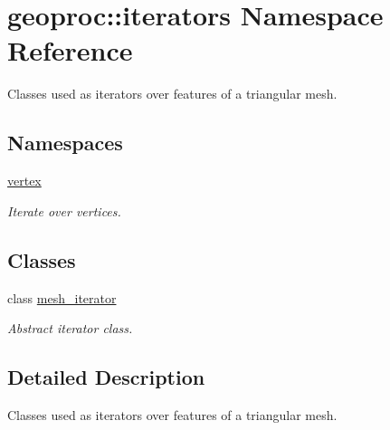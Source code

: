\hypertarget{namespacegeoproc_1_1iterators}{}\section{geoproc\+:\+:iterators Namespace Reference}
\label{namespacegeoproc_1_1iterators}


Classes used as iterators over features of a triangular mesh.  


\subsection*{Namespaces}
\begin{DoxyCompactItemize}
\item 
 \hyperlink{namespacegeoproc_1_1iterators_1_1vertex}{vertex}
\begin{DoxyCompactList}\small\item\em Iterate over vertices. \end{DoxyCompactList}\end{DoxyCompactItemize}
\subsection*{Classes}
\begin{DoxyCompactItemize}
\item 
class \hyperlink{classgeoproc_1_1iterators_1_1mesh__iterator}{mesh\+\_\+iterator}
\begin{DoxyCompactList}\small\item\em Abstract iterator class. \end{DoxyCompactList}\end{DoxyCompactItemize}


\subsection{Detailed Description}
Classes used as iterators over features of a triangular mesh. 